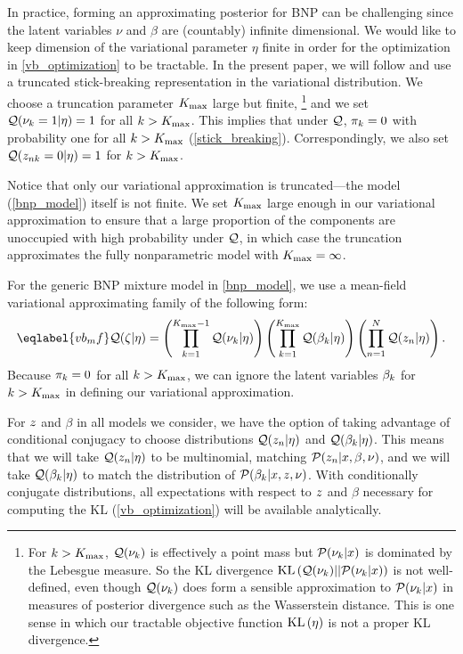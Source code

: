 In practice, forming an approximating posterior for BNP can be challenging since
the latent variables $\nu$ and $\beta$ are (countably) infinite dimensional. We
would like to keep dimension of the variational parameter $\eta$ finite in order
for the optimization in \eqref{vb_optimization} to be tractable. In the present
paper, we will follow \citet{blei:2006:vi_for_dp} and use a truncated
stick-breaking representation in the variational distribution. We choose a
truncation parameter ${K_{\mathrm{max}}}$ large but finite,
%
\footnote{For $k > {K_{\mathrm{max}}}$, $\mathcal{Q}(\nu_k)$ is effectively a point mass  but
$\mathcal{P}(\nu_k \vert x)$ is dominated by the Lebesgue measure.  So the KL
divergence $\mathrm{KL}\left(\mathcal{Q}(\nu_k) || \mathcal{P}(\nu_k \vert x)\right)$ is not well-defined, even
though $\mathcal{Q}(\nu_k)$ does form a sensible approximation to $\mathcal{P}(\nu_k \vert x)$
in measures of posterior divergence such as the Wasserstein distance.  This is
one sense in which our tractable objective function $\mathrm{KL}\left(\eta\right)$ is not a proper
KL divergence. }
%
and we set $\mathcal{Q}(\nu_k = 1 | \eta) =
1$ for all $k > {K_{\mathrm{max}}}$. This implies that under $\mathcal{Q}$, $\pi_k = 0$ with
probability one for all $k > {K_{\mathrm{max}}}$ (\eqref{stick_breaking}). Correspondingly,
we also set $\mathcal{Q}(z_{nk} = 0 | \eta) = 1$ for $k > {K_{\mathrm{max}}}$.

Notice that only our variational approximation is truncated---the model
(\eqref{bnp_model}) itself is not finite. We set ${K_{\mathrm{max}}}$ large enough in our
variational approximation to ensure that a large proportion of the components
are unoccupied with high probability under $\mathcal{Q}$, in which case the truncation
approximates the fully nonparametric model with ${K_{\mathrm{max}}} = \infty$.

For the generic BNP mixture model in \eqref{bnp_model}, we use a mean-field
variational approximating family of the following form:
%
\begin{align}\eqlabel{vb_mf}
%
\q(\zeta \vert \eta) =
    \left( \prod_{\k=1}^{\kmax - 1} \q(\nuk \vert \eta) \right)
    \left( \prod_{\k=1}^{\kmax} \q(\beta_\k \vert \eta) \right)
    \left( \prod_{\n=1}^{\N} \q(\z_{\n} \vert \eta) \right).
%
\end{align}
%
Because $\pi_k = 0$ for all $k > {K_{\mathrm{max}}}$, we can ignore the latent variables
$\beta_k$ for $k > {K_{\mathrm{max}}}$ in defining our variational approximation.


For $z$ and $\beta$ in all models we consider, we have the option of taking
advantage of conditional conjugacy to choose distributions $\mathcal{Q}(z_n \vert
\eta)$ and $\mathcal{Q}(\beta_k \vert \eta)$. This means that we will take $\mathcal{Q}(z_n
\vert \eta)$ to be multinomial, matching $\mathcal{P}(z_{n} \vert x, \beta, \nu)$, and
we will take $\mathcal{Q}(\beta_k \vert \eta)$ to match the distribution of
$\mathcal{P}(\beta_{k} \vert x, z, \nu)$. With conditionally conjugate distributions,
all expectations with respect to $z$ and $\beta$ necessary for computing the
$\mathrm{KL}$ (\eqref{vb_optimization}) will be available analytically.

